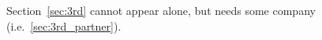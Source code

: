 \documentclass[12pt,a4paper,finnish]{tutthesis}
\begin{document}
Section~\ref{sec:3rd} cannot appear alone, but needs some company
(i.e.~\ref{sec:3rd_partner}).








\newpage

\renewcommand{\bibname}{Lähteet}         %


%
%





\end{document}
